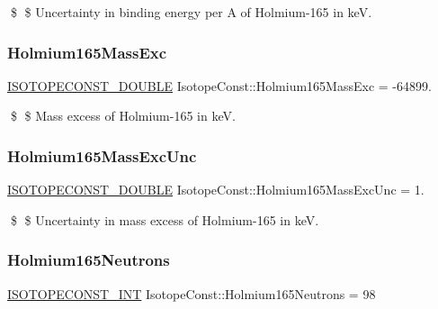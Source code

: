 \$ \$ Uncertainty in binding energy per A of Holmium-\/165 in keV. \mbox{\label{group___isotope_const-_holmium-_ho165_ga9e82249a8d90250d1fcf5a2a93fabd60}} 
\subsubsection{\texorpdfstring{Holmium165\+Mass\+Exc}{Holmium165MassExc}}
{\footnotesize\ttfamily \mbox{\hyperlink{group___isotope_const-_macros_ga8f45a7272ce02c0b4c65c44636ed719a}{I\+S\+O\+T\+O\+P\+E\+C\+O\+N\+S\+T\+\_\+\+D\+O\+U\+B\+LE}} Isotope\+Const\+::\+Holmium165\+Mass\+Exc = -\/64899.}

\$ \$ Mass excess of Holmium-\/165 in keV. \mbox{\label{group___isotope_const-_holmium-_ho165_ga53c44ea294122d7c9014b17fe9ba6a4f}} 
\subsubsection{\texorpdfstring{Holmium165\+Mass\+Exc\+Unc}{Holmium165MassExcUnc}}
{\footnotesize\ttfamily \mbox{\hyperlink{group___isotope_const-_macros_ga8f45a7272ce02c0b4c65c44636ed719a}{I\+S\+O\+T\+O\+P\+E\+C\+O\+N\+S\+T\+\_\+\+D\+O\+U\+B\+LE}} Isotope\+Const\+::\+Holmium165\+Mass\+Exc\+Unc = 1.}

\$ \$ Uncertainty in mass excess of Holmium-\/165 in keV. \mbox{\label{group___isotope_const-_holmium-_ho165_ga39d927f7c2e1cf4d8e5e2e9ac557d5d3}} 
\subsubsection{\texorpdfstring{Holmium165\+Neutrons}{Holmium165Neutrons}}
{\footnotesize\ttfamily \mbox{\hyperlink{group___isotope_const-_macros_ga5f18360b3e99483a35c32d789e62621c}{I\+S\+O\+T\+O\+P\+E\+C\+O\+N\+S\+T\+\_\+\+I\+NT}} Isotope\+Const\+::\+Holmium165\+Neutrons = 98}

